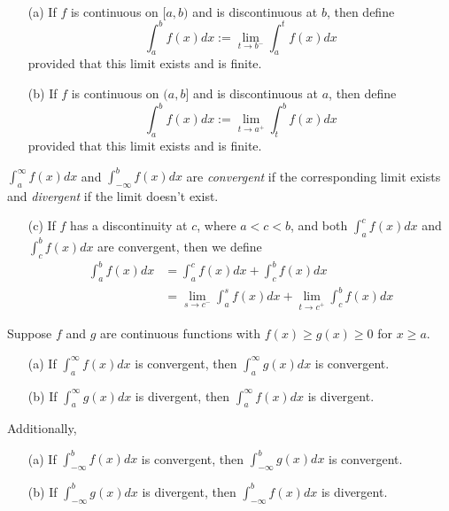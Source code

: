 \begin{definition} \ \\
  \begin{enumerate}
    \item[(a)] If $f$ is continuous on $[a, b)$ and is discontinuous at $b$, then define
    \[
      \int_a^b f(x) dx := \lim_{t \to b^-} \int_a^t f(x) dx
    \]
    provided that this limit exists and is finite.

    \item[(b)] If $f$ is continuous on $(a, b]$ and is discontinuous at $a$, then define
    \[
      \int_a^b f(x)dx := \lim_{t \to a^+} \int_t^b f(x)dx
    \]
    provided that this limit exists and is finite.
  \end{enumerate}

  $\int_a^\infty f(x)dx$ and $\int_{-\infty}^b f(x)dx$ are \textit{convergent} if the corresponding limit exists and \textit{divergent} if the limit doesn't exist.

  \begin{enumerate}
    \item[(c)] If $f$ has a discontinuity at $c$, where $a < c < b$, and both $\int_a^c f(x) dx$ and $\int_c^b f(x) dx$ are convergent, then we define
    \begin{align*}
      \int_a^b f(x)dx &= \int_a^c f(x) dx + \int_c^b f(x) dx \\
                                &= \lim_{s \to c^-} \int_a^s f(x) dx + \lim_{t \to c^+} \int_c^b f(x) dx
    \end{align*}
  \end{enumerate}
\end{definition}

\begin{theorem}
  Suppose $f$ and $g$ are continuous functions with $f(x) \geq g(x) \geq 0$ for $x \geq a$.
  \begin{itemize}
    \item[(a)] If $\int_a^\infty f(x)dx$ is convergent, then $\int_a^\infty g(x)dx$ is convergent.
    \item[(b)] If $\int_a^\infty g(x)dx$ is divergent, then $\int_a^\infty f(x)dx$ is divergent.
  \end{itemize}
  Additionally,
  \begin{itemize}
    \item[(a)] If $\int_{-\infty}^b f(x)dx$ is convergent, then $\int_{-\infty}^b g(x)dx$ is convergent.
    \item[(b)] If $\int_{-\infty}^b g(x)dx$ is divergent, then $\int_{-\infty}^b f(x)dx$ is divergent.
  \end{itemize}
\end{theorem}

